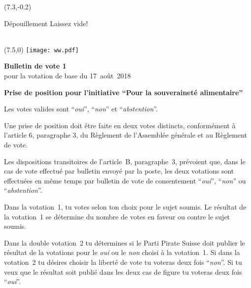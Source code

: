 \documentclass[11pt, a4paper]{scrartcl}
\newcommand{\votingdate}{17~août~2018}
\newcommand{\oui}{\enquote{\textit{oui}}}
\newcommand{\non}{\enquote{\textit{non}}}
\newcommand{\abstention}{\enquote{\textit{abstention}}}
\begin{document}
{\begin{minipage}[t][12.5cm][t]{\textwidth}
\begin{textblock}{6}(7.3,-0.2)
\begin{framed}
Dépouillement \hfill Laissez vide! \\
\vspace{1.5cm} ~ \\
\end{framed}
\end{textblock}


\end{minipage}

\newpage

\begin{minipage}[t][12.5cm][t]{17.7cm}

\begin{textblock}{6}(7.5,0)
\texttt{[image: ww.pdf]}
\end{textblock}

{\LARGE\textbf{Bulletin de vote 1}} \\
pour la votation de base du \votingdate{} \\

\vspace{2cm}

\textbf{Prise de position pour l'initiative \enquote{Pour la souveraineté alimentaire}}

\vspace{0.2cm}
Les votes valides sont \oui{}, \non{} et \abstention{}.

\vspace{0.2cm}
Une prise de position doit être faite en deux votes distincts, conformément à l'article 6, paragraphe 3, du Règlement de l'Assemblée générale et au Règlement de vote.

\vspace{0.2cm}
Les dispositions transitoires de l'article~B, paragraphe~3, prévoient que, dans le cas de vote effectué par bulletin envoyé par la poste, les deux votations sont effectuées en même temps par bulletin de vote de consentement \oui{}, \non{} ou \abstention{}.

\vspace{0.2cm}
Dans la votation~1, tu votes selon ton choix pour le sujet soumis. Le résultat de la votation~1 se détermine du nombre de votes en faveur ou contre le sujet soumis.

\vspace{0.2cm}
Dans la double votation~2 tu détermines si le Parti Pirate Suisse doit publier le résultat de la votations pour le \textit{oui} ou le \textit{non} choisi à la votation~1. Si dans la votation~2 tu désires choisir la liberté de vote tu voteras deux fois \non{}. Si tu veux que le résultat soit publié dans les deux cas de figure tu voteras deux fois \oui{}.


\end{minipage}}
\end{document}
